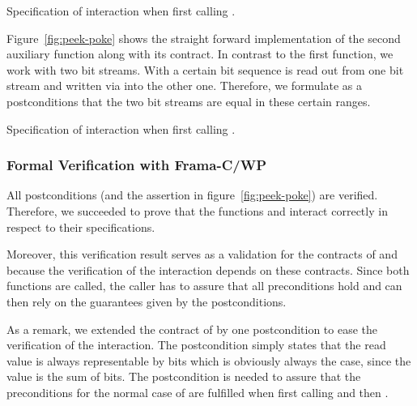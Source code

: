 \begin{listing}[hbt]
\begin{minipage}{\textwidth}

\end{minipage}
\caption{\label{fig:poke-peek} Specification of interaction when first calling \poke.}
\end{listing}

Figure~\ref{fig:peek-poke} shows the straight forward implementation 
of the second auxiliary function along with its \acsl contract.
In contrast to the first function, we work with two bit streams.
With \peek a certain bit sequence is read out from one bit stream
and written via \poke into the other one.
Therefore, we formulate as a postconditions that
the two bit streams are equal in these certain ranges.

\begin{listing}[hbt]
\begin{minipage}{\textwidth}

\end{minipage}
\caption{\label{fig:peek-poke} Specification of interaction when first calling \peek.}
\end{listing}

 \FloatBarrier

\subsubsection{Formal Verification with Frama-C/WP}

All postconditions (and the assertion in figure~\ref{fig:peek-poke})
are verified. Therefore, we succeeded to prove that the 
functions \peek and \poke interact correctly
in respect to their specifications.

Moreover, this verification result serves as a validation for the contracts
of \peek and \poke because the verification of the interaction 
depends on these contracts. Since both functions are called,
the caller has to assure that all preconditions hold
and can then rely on the guarantees given by the postconditions.

As a remark, we extended the contract of \peek by one postcondition 
to ease the verification of the interaction.
The postcondition simply states that the read value is always representable 
by  bits which is obviously always the case,
since the value is the sum of  bits.
The postcondition is needed to assure that the preconditions for the normal case
of \poke are fulfilled when first calling \peek and then \poke.

